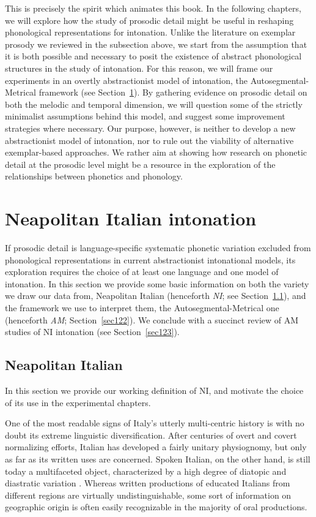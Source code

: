 This is precisely the spirit which animates this book. In the following chapters, we will explore how the study of prosodic detail might be useful in reshaping phonological representations for intonation. Unlike the literature on exemplar prosody we reviewed in the subsection above, we start from the assumption that it is both possible and necessary to posit the existence of abstract phonological structures in the study of intonation. For this reason, we will frame our experiments in an overtly abstractionist model of intonation, the Autosegmental-Metrical framework (see Section~\ref{sec12}). By gathering evidence on prosodic detail on both the melodic and temporal dimension, we will question some of the strictly minimalist assumptions behind this model, and suggest some improvement strategies where necessary. Our purpose, however, is neither to develop a new abstractionist model of intonation, nor to rule out the viability of alternative exemplar-based approaches. We rather aim at showing how research on phonetic detail at the prosodic level might be a resource in the exploration of the relationships between phonetics and phonology.

\section{Neapolitan Italian intonation}\label{sec12}
If prosodic detail is language-specific systematic phonetic variation excluded from phonological representations in current abstractionist intonational models, its exploration requires the choice of at least one language and one model of intonation. In this section we provide some basic information on both the variety we draw our data from, Neapolitan Italian (henceforth \textit{NI}; see Section~\ref{sec121}), and the framework we use to interpret them, the Autosegmental-Metrical one (henceforth \textit{AM}; Section~\ref{sec122}). We conclude with a succinct review of AM studies of NI intonation (see Section~\ref{sec123}).

\subsection{Neapolitan Italian}\label{sec121}
In this section we provide our working definition of NI, and motivate the choice of its use in the experimental chapters.

One of the most readable signs of Italy's utterly multi-centric history is with no doubt its extreme linguistic diversification. After centuries of overt and covert normalizing efforts, Italian has developed a fairly unitary physiognomy, but only as far as its written uses are concerned. Spoken Italian, on the other hand, is still today a multifaceted object, characterized by a high degree of diatopic and diastratic variation \citep{demauro1970storia}. Whereas written productions of educated Italians from different regions are virtually undistinguishable, some sort of information on geographic origin is often easily recognizable in the majority of oral productions. 

